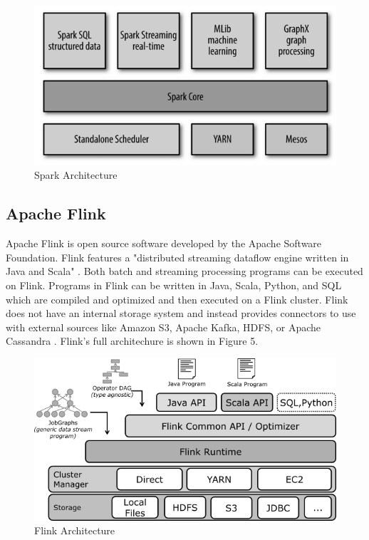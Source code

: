 \documentclass[9pt,twocolumn,twoside]{../../styles/osajnl}
\begin{document}

\begin{figure}[ht]
  \includegraphics[scale=0.44]{images/spark-architecture.jpg}
  \caption{Spark Architecture \cite{www-techstory}}
\end{figure}


\subsection{Apache Flink}

Apache Flink is open source software developed by the Apache Software Foundation.  Flink features a "distributed streaming dataflow engine written in Java and Scala" \cite{www-wikiflink}.  Both batch and streaming processing programs can be executed on Flink.  Programs in Flink can be written in Java, Scala, Python, and SQL which are compiled and optimized and then executed on a Flink cluster.  Flink does not have an internal storage system and instead provides connectors to use with external sources like Amazon S3, Apache Kafka, HDFS, or Apache Cassandra \cite{www-wikiflink}.  Flink's full architechure is shown in Figure 5.


\begin{figure}[ht]
  \includegraphics[scale=0.45]{images/flink-architecture.jpg}
  \caption{Flink Architecture \cite{www-flinkarch}}
\end{figure}
\end{document}
